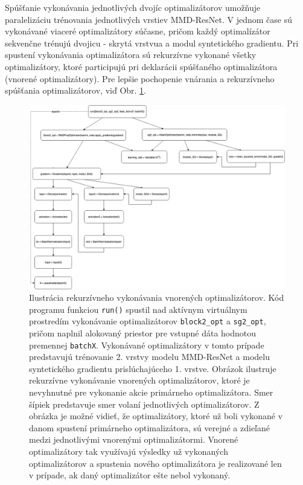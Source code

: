 Spúšťanie vykonávania jednotlivých dvojíc optimalizátorov umožňuje paralelizáciu trénovania jednotlivých vrstiev MMD-ResNet. V jednom čase sú vykonávané viaceré optimalizátory súčasne, pričom každý optimalízátor sekvenčne trénujú dvojicu - skrytá vrstvua a modul syntetického gradientu. Pri spustení vykonávania optimalizátora sú rekurzívne vykonané všetky optimalizátory, ktoré participujú pri deklarácii spúšťaného optimalizátora (vnorené optimalizátory). Pre lepšie pochopenie vnárania a rekurzívneho spúšťania optimalizátorov, viď Obr. \ref{rekurzivne}.

\begin{figure}
\centerline{\includegraphics[width=1.0\textwidth]{images/rekurzivne.png}}
\caption[Ilustrácia rekurzívneho vykonávania vnorených optimalizátorov]{Ilustrácia rekurzívneho vykonávania vnorených optimalizátorov. Kód programu funkciou \texttt{run()} spustil nad aktívnym virtuálnym prostredím vykonávanie optimalizátorov \texttt{block2_opt} a \texttt{sg2_opt}, pričom naplnil alokovaný priestor pre vstupné dáta hodnotou premennej \texttt{batchX}. Vykonávané optimalizátory v tomto prípade predstavujú trénovanie 2. vrstvy modelu MMD-ResNet a modelu syntetického gradientu prislúchajúceho 1. vrstve. Obrázok ilustruje rekurzívne vykonávanie vnorených optimalizátorov, ktoré je nevyhnutné pre vykonanie akcie primárneho optimalizátora. Smer šípiek predstavuje smer volaní jednotlivých optimalizátorov. Z obrázka je možné vidieť, že optimalizátory, ktoré už boli vykonané v danom spustení primárneho optimalizátora, sú verejné a zdieľané medzi jednotlivými vnorenými optimalizátormi. Vnorené optimalizátory tak využívajú výsledky už vykonaných optimalizátorov a spustenia nového optimalizátora je realizované len v prípade, ak daný optimalizátor ešte nebol vykonaný.}
\label{rekurzivne}
\end{figure}

